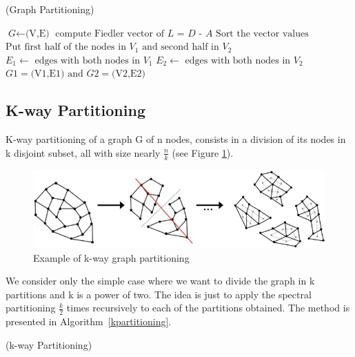 \documentclass[]{usiinfbachelorproject}
\makeatletter
\def\BState{\State\hskip-\ALG@thistlm}
\makeatother
\begin{document}
\begin{algorithm}
\caption{ (Graph Partitioning)}\label{gpartitioning}
\begin{algorithmic}[1]
\State $\textit{G} \gets \text{(V,E)}$
\State $\text{compute Fiedler vector of } \textit{L = D - A}$
\State $\text{Sort the vector values}$
\State $\text{Put first half of the nodes in } V_1 \text{ and second half in } V_2$
\State $ E_1 \gets \text{ edges with both nodes in } V_1$
\State $ E_2 \gets \text{ edges with both nodes in } V_2$\\
\Return $\textit{G1} = \text{(V1,E1) and } \textit{G2} = \text{(V2,E2)}$
\EndProcedure
\end{algorithmic}
\end{algorithm}



\subsection{K-way Partitioning}
K-way partitioning of a graph G of n nodes, consists in a division of its nodes in k disjoint subset, all with size nearly $\frac{n}{k}$ (see Figure \ref{fig:kpartitioning}).

\begin{figure}[ht]
	\centering
	\includegraphics[height=3cm]{img/k_way_partitioning.jpg}
	\caption{Example of k-way graph partitioning}
	\label{fig:kpartitioning}
\end{figure}

We consider only the simple case where we want to divide the graph in k partitions and k is a power of two. The idea is just to apply the spectral partitioning $\frac{k}{2}$ times recursively to each of the partitions obtained. The method is presented in Algorithm~\ref{kpartitioning}.

\begin{algorithm}
\caption{ (k-way Partitioning)}\label{kpartitioning}
\end{algorithm}
\end{document}
